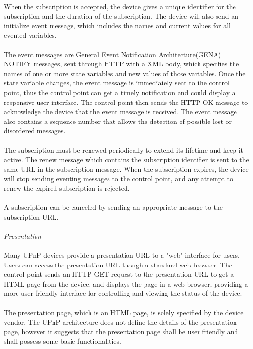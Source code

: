 \\
When the subscription is accepted, the device gives a unique identifier for the subscription and 
the duration of the subscription. The device will also send an initialize event message, which 
includes the names and current values for all evented variables. \\
\\
The event messages are General Event Notification Architecture(GENA) NOTIFY 
messages, sent through HTTP with a XML body, which specifies the names of one or 
more state variables and new values of those variables. Once the state variable 
changes, the event message is immediately sent to the control point, thus the 
control point can get a timely notification and could display a responsive user 
interface. The control point then sends the HTTP OK message to acknowledge the device 
that the event message is received. The event message also contains a sequence 
number that allows the detection of possible lost or disordered messages. \\
\\
The subscription must be renewed periodically to extend its lifetime and keep it active. The renew 
message which contains the subscription identifier is sent to the same URL in the subscription 
message. When the subscription expires, the device will stop sending eventing messages to the 
control point, and any attempt to renew the expired subscription is rejected. \\
\\
A subscription can be canceled by sending an appropriate message to the
subscription URL. \\
\\
\emph{Presentation} \\
\\ 
Many UPnP devices provide a presentation URL to a "web" interface for users. Users can access the 
presentation URL though a standard web browser. The control point sends an HTTP GET request to the 
presentation URL to get a HTML page from the device, and displays the page in a web browser, 
providing a more user-friendly interface for controlling and viewing the status
of the device. \\
\\
The presentation page, which is an HTML page, is solely specified by the device vendor.
The UPnP architecture does not define the details of the presentation page,
however it suggests that the presentation page shall be user friendly and shall
possess some basic functionalities.\\
